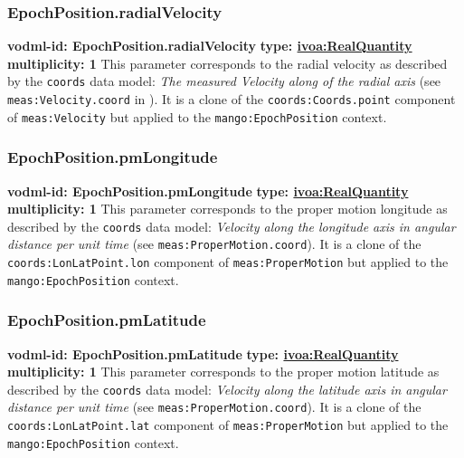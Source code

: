     \subsubsection{EpochPosition.radialVelocity}
    \textbf{vodml-id: EpochPosition.radialVelocity} \newline
    \textbf{type: \hyperref[sect:ivoa]{ivoa:RealQuantity}} \newline
    \textbf{multiplicity: 1} \newline
    This parameter corresponds to the radial velocity as described by the \texttt{coords} data model: \textit{The measured Velocity along of the radial axis } (see \texttt{meas:Velocity.coord} in \cite{2022ivoa.spec.1004R}). It is a clone of the \texttt{coords:Coords.point} component of \texttt{meas:Velocity} but applied to the \texttt{mango:EpochPosition} context.

    \subsubsection{EpochPosition.pmLongitude}
    \textbf{vodml-id: EpochPosition.pmLongitude} \newline
    \textbf{type: \hyperref[sect:ivoa]{ivoa:RealQuantity}} \newline
    \textbf{multiplicity: 1} \newline
    This parameter corresponds to the proper motion longitude as described by the \texttt{coords} data model: \textit{Velocity along the longitude axis in angular distance per unit time} (see \texttt{meas:ProperMotion.coord}). It is a clone of the \texttt{coords:LonLatPoint.lon} component of \texttt{meas:ProperMotion} but applied to the \texttt{mango:EpochPosition} context.

    \subsubsection{EpochPosition.pmLatitude}
    \textbf{vodml-id: EpochPosition.pmLatitude} \newline
    \textbf{type: \hyperref[sect:ivoa]{ivoa:RealQuantity}} \newline
    \textbf{multiplicity: 1} \newline
    This parameter corresponds to the proper motion latitude as described by the \texttt{coords} data model: \textit{Velocity along the latitude axis in angular distance per unit time} (see \texttt{meas:ProperMotion.coord}). It is a clone of the \texttt{coords:LonLatPoint.lat} component of \texttt{meas:ProperMotion} but applied to the \texttt{mango:EpochPosition} context.

